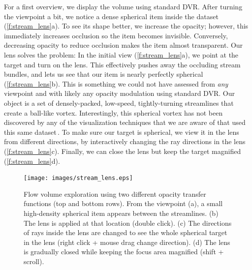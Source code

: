 For a first overview, we display the volume using standard DVR. After turning the viewpoint a bit, we notice a dense spherical item inside the dataset (\autoref{f:stream_lens}a). To see its shape better, we increase the opacity; however, this immediately increases occlusion so the item becomes invisible. Conversely, decreasing opacity to reduce occlusion makes the item almost transparent. Our lens solves the problem: In the initial view (\autoref{f:stream_lens}a), we point at the target and turn on the lens. This effectively pushes away the occluding stream bundles, and lets us see that our item is nearly perfectly spherical (\autoref{f:stream_lens}b). This is something we could not have assessed from \emph{any} viewpoint and with likely any opacity modulation using standard DVR. Our object is a set of densely-packed, low-speed, tightly-turning streamlines that create a ball-like vortex. Interestingly, this spherical vortex has not been discovered by any of the visualization techniques that we are aware of that used this same dataset\,\cite{telea_vis_99,griebel2004flow,ddh,lhuillier2017ffteb}. To make sure our target is spherical, we view it in the lens from different directions, by interactively changing the ray directions in the lens (\autoref{f:stream_lens}c). Finally, we can close the lens but keep the target magnified (\autoref{f:stream_lens}d).


\begin{figure}[htb]
\texttt{[image: images/stream\_lens.eps]}
\caption{Flow volume exploration using two different opacity transfer functions (top and bottom rows). From the viewpoint (a), a small high-density spherical item appears between the streamlines. (b) The lens is applied at that location (double click). (c) The directions of rays inside the lens are changed to see the whole spherical target in the lens (right click + mouse drag change direction). (d) The lens is gradually closed while keeping the focus area magnified (shift + scroll).}
\label{f:stream_lens}
\end{figure}

